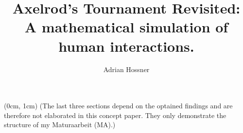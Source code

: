 \documentclass[4pt, english]{article}
\title{
	Axelrod's Tournament Revisited: \\
	\large A mathematical simulation of human interactions.
}
\author{Adrian Hossner}
\begin{document}
\maketitle
\tableofcontents

\begin{textblock*}{100mm}(0cm, 1cm)
	(The last three sections depend on the optained findings and are therefore not elaborated in this concept paper. They only demonstrate the structure of my Maturaarbeit (MA).)
\end{textblock*}

\newpage
\end{document}
